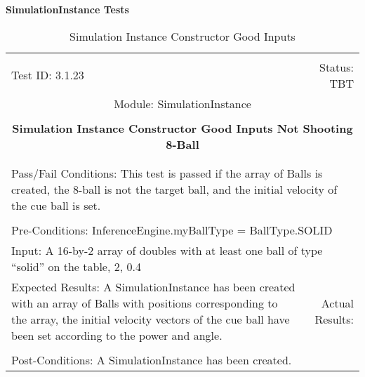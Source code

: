 \documentclass[titlepage]{article}
\begin{document}
\large{\textbf{SimulationInstance Tests}}
\begin{center}%
\begin{table}
\begin{tabular}{|l r|}\hline&\\[-2mm]
	Test ID: 3.1.23	&Status: TBT\\[-3mm]
	\multicolumn{2}{|c|}{Module: SimulationInstance}\\&\\
	\multicolumn{2}{|c|}{\textbf{\large{Simulation Instance Constructor Good Inputs Not Shooting 8-Ball}}}\\&\\\hline&\\[-3mm]
	\multicolumn{2}{|p{\textwidth}|}{Pass/Fail Conditions: This test is passed if the array of Balls is created, the 8-ball is not the target ball, and the initial velocity of the cue ball is set.}\\[1mm]\hline&\\[-3mm]
	\multicolumn{2}{|p{\textwidth}|}{Pre-Conditions: InferenceEngine.myBallType = BallType.SOLID}\\[4mm]
	\multicolumn{2}{|p{\textwidth}|}{Input: A 16-by-2 array of doubles with at least one ball of type ``solid'' on the table, 2, 0.4}\\[2mm]\hline
	\multicolumn{1}{|p{0.49\textwidth}}{Expected Results: A SimulationInstance has been created with an array of Balls with positions corresponding to the array, the initial velocity vectors of the cue ball have been set according to the power and angle.}	&\multicolumn{1}{|p{0.45\textwidth}|}{Actual Results: }\\\hline&\\[-3mm]
	\multicolumn{2}{|p{\textwidth}|}{Post-Conditions: A SimulationInstance has been created.}\\\hline
\end{tabular}
\caption{Simulation Instance Constructor Good Inputs}
\end{table}
\end{center}
\end{document}
